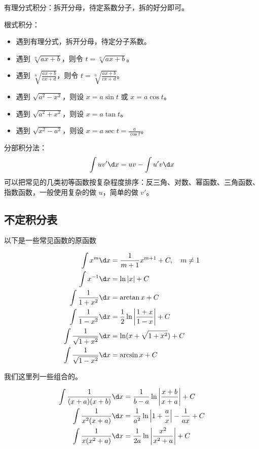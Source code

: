 有理分式积分：拆开分母，待定系数分子，拆的好分即可。

根式积分：

\begin{itemize}
	\item 遇到有理分式，拆开分母，待定分子系数。
	\item 遇到 $\sqrt[n]{ax+b}$，则令 $t = \sqrt[n]{ax+b}$。
	\item 遇到 $\sqrt[n]{\frac{ax+b}{cx+d}}$，则令 $t = \sqrt[n]{\frac{ax+b}{cx+d}}$。
	\item 遇到 $\sqrt{a^2 - x^2}$，则设 $x = a\sin t$ 或 $x = a\cos t$。
	\item 遇到 $\sqrt{a^2 + x^2}$，则设 $x = a \tan t$。
	\item 遇到 $\sqrt{x^2 - a^2}$，则设 $x = a \sec t = \frac{a}{\cos t}$。
\end{itemize}

分部积分法：
\[ \int u v' \d x = u v - \int u' v \d x \]
可以把常见的几类初等函数按复杂程度排序：反三角、对数、幂函数、三角函数、指数函数，一般使用复杂的做 $u$，简单的做 $v'$。

\subsection{不定积分表}

以下是一些常见函数的原函数

\[ \begin{aligned}
		\int {x}^{m} \d x                  & = \frac{1}{m + 1} x^{m+1} + C, \quad m \neq 1        \\
		\int x^{-1} \d x                   & = \ln |x| + C                                        \\
		\int \frac{1}{1 + x^2} \d x        & = \arctan x + C                                      \\
		\int \frac{1}{1 - x^2} \d x        & = \frac{1}{2} \ln \left| \frac{1+x}{1-x} \right| + C \\
		\int \frac{1}{\sqrt{1 + x^2}} \d x & = \ln(x+\sqrt{1 + x^2}) + C                          \\
		\int \frac{1}{\sqrt{1 - x^2}} \d x & = \arcsin x + C                                      \\
	\end{aligned} \]

我们这里列一些组合的。



\begin{example}[有理式]
	\[ \begin{aligned}
			\int \frac{1}{(x+a)(x+b)} \d x & = \frac{1}{b-a} \ln \left| \frac{x+b}{x+a} \right| + C                \\
			\int \frac{1}{x^2(x+a)}   \d x & = \frac{1}{a^2} \ln \left| 1 + \frac{a}{x} \right| - \frac{1}{ax} + C \\
			\int \frac{1}{x(x^2+a)}   \d x & = \frac{1}{2a} \ln \left| \frac{x^2}{x^2+a}\right| + C
		\end{aligned} \]
\end{example}


